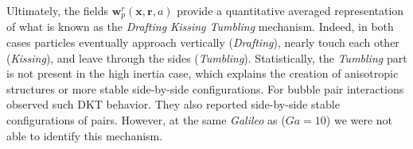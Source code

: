 Ultimately, the fields $\textbf{w}^r_p(\textbf{x},\textbf{r}, a)$ provide a quantitative averaged representation of what is known as the \textit{Drafting Kissing Tumbling} \citep{fortes1987nonlinear} mechanism. 
Indeed, in both cases particles eventually approach vertically (\textit{Drafting}), nearly touch each other (\textit{Kissing}), and leave through the sides (\textit{Tumbling}). 
Statistically, the \textit{Tumbling} part is not present in the high inertia case, which explains the creation of anisotropic structures or more stable side-by-side configurations. 
For bubble pair interactions \citet{zhang2021three} observed such DKT behavior.
They also reported side-by-side stable configurations of pairs. 
However, at the same \textit{Galileo} as \citet{zhang2021three} ($Ga = 10$) we were not able to identify this mechanism. 


